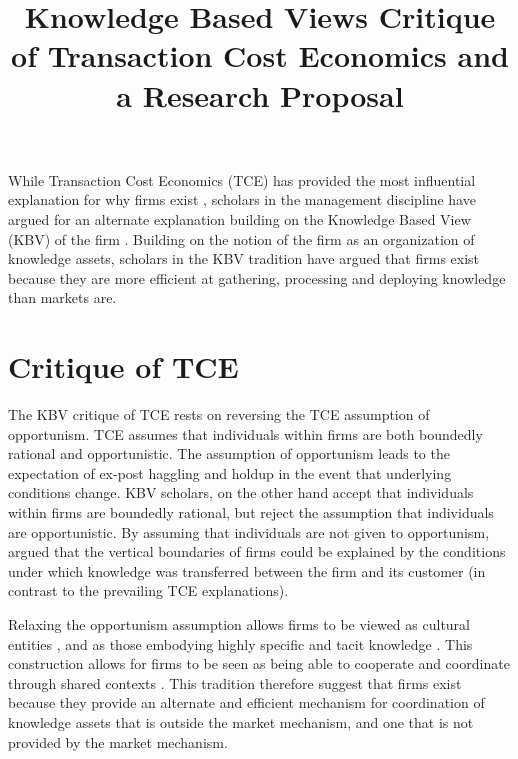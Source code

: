 \documentclass[12pt,letterpaper]{article}
\begin{document}
\title{Knowledge Based View\textquotesingle s Critique of Transaction Cost Economics and a Research Proposal}
\date{}
\maketitle

\pagestyle{fancy}
\fancyhf{}
\rhead{\thepage}

While Transaction Cost Economics (TCE) has provided the most influential explanation for why firms exist \citep{Coase1937, Williamson1975, Williamson1979}, scholars in the management discipline have argued for an alternate explanation building on the Knowledge Based View (KBV) of the firm \citep{Conner1996}. Building on the notion of the firm as an organization of knowledge assets, scholars in the KBV tradition have argued that firms exist because they are more efficient at gathering, processing and deploying knowledge than markets are. 


\section{Critique of TCE}
The KBV critique of TCE rests  on reversing the TCE assumption of opportunism. TCE assumes that individuals within firms are both boundedly rational and opportunistic. The assumption of opportunism leads to the expectation of ex-post haggling and holdup  in the event that underlying conditions change. KBV scholars, on the other hand accept that individuals within firms are boundedly rational, but reject the assumption that individuals are opportunistic. By assuming that individuals are not given to opportunism, \cite{Demsetz1991} argued that the vertical boundaries of firms could be explained by the conditions under which knowledge was transferred between the firm and its customer (in contrast to the prevailing TCE explanations).

Relaxing the opportunism assumption allows firms to be viewed as cultural entities \citep{Madhok1996}, and as those embodying highly specific and tacit knowledge \cite{Kogut1996}. This construction allows for firms to be seen as being able to cooperate and coordinate through shared contexts \cite{Kogut1996, Malmgren1961}. This tradition therefore suggest that firms exist because they provide an alternate and efficient mechanism for coordination of knowledge assets that is outside the market mechanism, and one that is not provided by the market mechanism.
\end{document}

